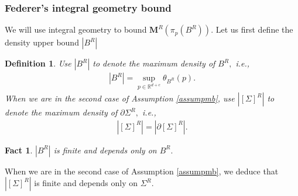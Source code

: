 \documentclass[11pt,a4paper]{amsart}
\numberwithin{equation}{section}
\newcommand{\Si}{\Sigma}
\newcommand{\ms}{\mathbf{M}}
\newcommand{\pd}{\partial}
\newcommand{\R}{\mathbb{R}}
\theoremstyle{plain}
\newtheorem{fact}{Fact}[subsection]
\newtheorem{defn}{Definition}[subsection]
\theoremstyle{definition}
\numberwithin{equation}{subsection}
\begin{document}
\subsubsection{Federer's integral geometry bound}
We will use integral geometry to bound $\ms^R\left(\pi_p\left( B^R\right)\right).$ Let us first define the density upper bound $|B^R|$
\begin{defn}\label{fctgrom}
	Use $\left|B^R\right|$ to denote the maximum density of $ B^R,$ i.e.,
	\begin{align*}
		\left|B^R\right|=\sup_{p\in\R^{d+c}}\theta_{ B^R}(p).
	\end{align*}
	When we are in the second case of Assumption \ref{assumpmb}, use $\left|[\Si]^R\right|$ to denote the maximum density of $\pd \Si^R,$ i.e.,
	\begin{align*}
		\left|[\Si]^R\right|=\left|\pd[\Si]^R\right|.
	\end{align*}
\end{defn}	
\begin{fact}
	$\left|B^R\right|$ is finite and depends only on $B^R.$\end{fact}When  we are in the second case of Assumption \ref{assumpmb}, we deduce that $\left|[\Si]^R\right|$ is finite and depends only on $\Si^R.$
\end{document}
